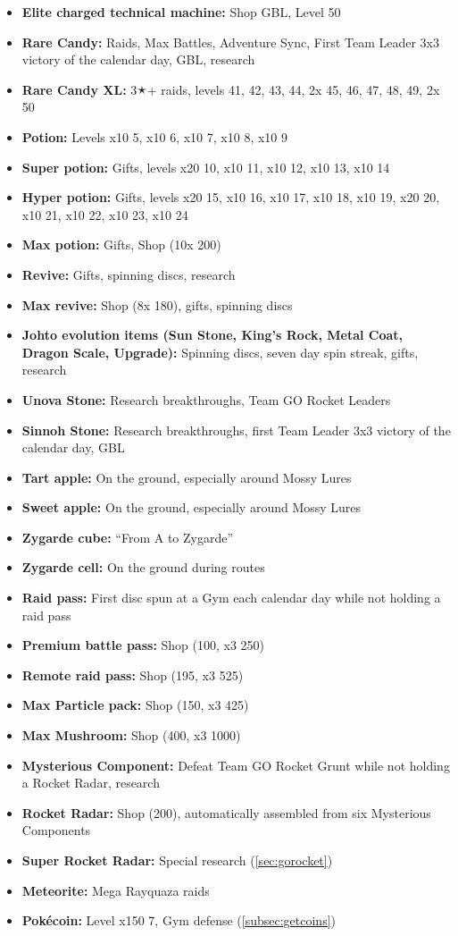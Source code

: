 \begin{itemize}[noitemsep]
\item \textbf{Elite charged technical machine:} Shop GBL, Level 50
\item \textbf{Rare Candy:} Raids, Max Battles, Adventure Sync, First Team Leader 3x3 victory of the calendar day, GBL, research
\item \textbf{Rare Candy XL:} 3🟉+ raids, levels 41, 42, 43, 44, 2x 45, 46, 47, 48, 49, 2x 50
\item \textbf{Potion:} Levels x10 5, x10 6, x10 7, x10 8, x10 9
\item \textbf{Super potion:} Gifts, levels x20 10, x10 11, x10 12, x10 13, x10 14
\item \textbf{Hyper potion:} Gifts, levels x20 15, x10 16, x10 17, x10 18, x10 19, x20 20, x10 21, x10 22, x10 23, x10 24
\item \textbf{Max potion:} Gifts, Shop (10x 200\coin)
\item \textbf{Revive:} Gifts, spinning discs, research
\item \textbf{Max revive:} Shop (8x 180\coin), gifts, spinning discs
\item \textbf{Johto evolution items (Sun Stone, King's Rock, Metal Coat, Dragon Scale, Upgrade):} Spinning discs, seven day spin streak, gifts, research
\item \textbf{Unova Stone:} Research breakthroughs, Team GO Rocket Leaders
\item \textbf{Sinnoh Stone:} Research breakthroughs, first Team Leader 3x3 victory of the calendar day, GBL
\item \textbf{Tart apple:} On the ground, especially around Mossy Lures
\item \textbf{Sweet apple:} On the ground, especially around Mossy Lures
\item \textbf{Zygarde cube:} ``From A to Zygarde''
\item \textbf{Zygarde cell:} On the ground during routes
\item \textbf{Raid pass:} First disc spun at a Gym each calendar day while not holding a raid pass
\item \textbf{Premium battle pass:} Shop (100\coin, x3 250\coin)
\item \textbf{Remote raid pass:} Shop (195\coin, x3 525\coin)
\item \textbf{Max Particle pack:} Shop (150\coin, x3 425\coin)
\item \textbf{Max Mushroom:} Shop (400\coin, x3 1000\coin)
\item \textbf{Mysterious Component:} Defeat Team GO Rocket Grunt while not holding a Rocket Radar, research
\item \textbf{Rocket Radar:} Shop (200\coin), automatically assembled from six Mysterious Components
\item \textbf{Super Rocket Radar:} Special research (\autoref{sec:gorocket})
\item \textbf{Meteorite:} Mega Rayquaza raids
\item \textbf{Pokécoin:} Level x150 7, Gym defense (\autoref{subsec:getcoins})
\end{itemize}
